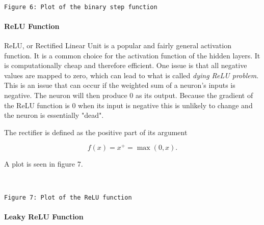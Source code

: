 \documentclass[11pt]{article}
\begin{document}
    \begin{center}
    \end{center}
    { \hspace*{\fill} \\}
    
    \begin{Verbatim}[commandchars=\\\{\}]
Figure 6: Plot of the binary step function
    \end{Verbatim}

    \hypertarget{relu-function}{%
\paragraph{ReLU Function}\label{relu-function}}

ReLU, or Rectified Linear Unit is a popular and fairly general
activation function. It is a common choice for the activation function
of the hidden layers. It is computationally cheap and therefore
efficient. One issue is that all negative values are mapped to zero,
which can lead to what is called \emph{dying ReLU problem}. This is an
issue that can occur if the weighted sum of a neuron's inputs is
negative. The neuron will then produce 0 as its output. Because the
gradient of the ReLU function is 0 when its input is negative this is
unlikely to change and the neuron is essentially "dead".

The rectifier is defined as the positive part of its argument

\[
f(x) = x^{+} = \max(0,x).
\] 

A plot is seen in figure 7.

    \begin{center}
    \end{center}
    { \hspace*{\fill} \\}
    
    \begin{Verbatim}[commandchars=\\\{\}]
Figure 7: Plot of the ReLU function
    \end{Verbatim}

    \hypertarget{leaky-relu-function}{%
\paragraph{Leaky ReLU Function}\label{leaky-relu-function}}
\end{document}
